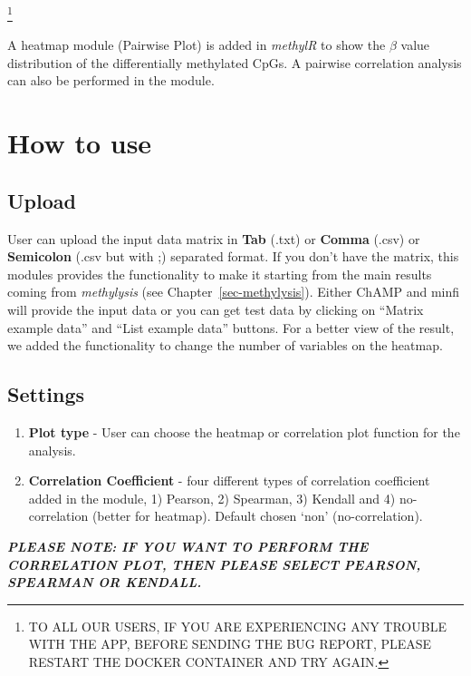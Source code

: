 \documentclass[
  a4paper,
  DIV=11,
  numbers=noendperiod,
  oneside,
  open=any]{scrreport}
\providecommand{\tightlist}{%
  \setlength{\itemsep}{0pt}\setlength{\parskip}{0pt}}\usepackage{longtable,booktabs,array}
\begin{document}
\footnote{TO ALL OUR USERS, IF YOU ARE EXPERIENCING ANY TROUBLE WITH THE
  APP, BEFORE SENDING THE BUG REPORT, PLEASE RESTART THE DOCKER
  CONTAINER AND TRY AGAIN.}

A heatmap module (Pairwise Plot) is added in \emph{methylR} to show the
\(\beta\) value distribution of the differentially methylated CpGs. A
pairwise correlation analysis can also be performed in the module.

\section{How to use}\label{how-to-use-4}

\subsection{Upload}\label{upload}

User can upload the input data matrix in \textbf{Tab} (.txt) or
\textbf{Comma} (.csv) or \textbf{Semicolon} (.csv but with ;) separated
format. If you don't have the matrix, this modules provides the
functionality to make it starting from the main results coming from
\emph{methylysis} (see Chapter~\ref{sec-methylysis}). Either ChAMP and
minfi will provide the input data or you can get test data by clicking
on ``Matrix example data'' and ``List example data'' buttons. For a
better view of the result, we added the functionality to change the
number of variables on the heatmap.

\subsection{Settings}\label{settings}

\begin{enumerate}
\def\labelenumi{\arabic{enumi}.}
\tightlist
\item
  \textbf{Plot type} - User can choose the heatmap or correlation plot
  function for the analysis.
\item
  \textbf{Correlation Coefficient} - four different types of correlation
  coefficient added in the module, 1) Pearson, 2) Spearman, 3) Kendall
  and 4) no-correlation (better for heatmap). Default chosen `non'
  (no-correlation).
\end{enumerate}

\begin{tcolorbox}[enhanced jigsaw, opacityback=0, toprule=.15mm, bottomtitle=1mm, colback=white, rightrule=.15mm, breakable, coltitle=black, colbacktitle=quarto-callout-important-color!10!white, toptitle=1mm, arc=.35mm, colframe=quarto-callout-important-color-frame, bottomrule=.15mm, opacitybacktitle=0.6, titlerule=0mm, leftrule=.75mm, title=\textcolor{quarto-callout-important-color}{\faExclamation}\hspace{0.5em}{Important}, left=2mm]

\textbf{\emph{PLEASE NOTE: IF YOU WANT TO PERFORM THE CORRELATION PLOT,
THEN PLEASE SELECT PEARSON, SPEARMAN OR KENDALL.}}

\end{tcolorbox}
\end{document}
